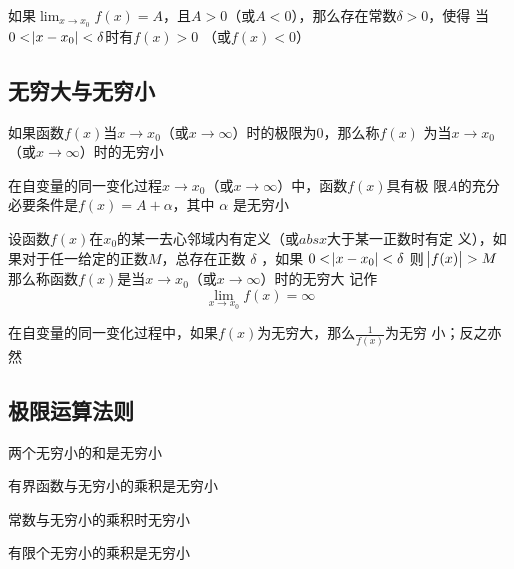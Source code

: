\documentclass[11pt]{article}
\begin{document}
\begin{theorem}[函数极限的局部保号性]
如果\(\lim_{x\to x_0}f(x)=A\)，且\(A>0\)（或\(A<0\)），那么存在常数\(\delta>0\)，使得
当\(0<\abs{x-x_0}<\delta\)时有\(f(x)>0\) （或\(f(x)<0\)）
\end{theorem}
\subsection{无穷大与无穷小}
\label{sec:org1fb2184}
\begin{definition}[]
如果函数\(f(x)\)当\(x\to x_0\)（或\(x\to\infty\)）时的极限为0，那么称\(f(x)\)
为当\(x\to x_0\)（或\(x\to\infty\)）时的无穷小
\end{definition}

\begin{theorem}[]
在自变量的同一变化过程\(x\to x_0\)（或\(x\to\infty\)）中，函数\(f(x)\)具有极
限\(A\)的充分必要条件是\(f(x)=A+\alpha\)，其中 \(\alpha\) 是无穷小
\end{theorem}

\begin{definition}[]
设函数\(f(x)\)在\(x_0\)的某一去心邻域内有定义（或\(abs{x}\)大于某一正数时有定
义），如果对于任一给定的正数\(M\)，总存在正数 \(\delta\) ，如果
\(0<\abs{x-x_0}<\delta\) 则
\(\abs{f(x)}>M\)
那么称函数\(f(x)\)是当\(x\to x_0\)（或\(x\to\infty\)）时的无穷大
记作
\begin{equation*}
\lim_{x\to x_0}f(x)=\infty
\end{equation*}
\end{definition}

\begin{theorem}[]
在自变量的同一变化过程中，如果\(f(x)\)为无穷大，那么\(\frac{1}{f(x)}\)为无穷
小；反之亦然
\end{theorem}
\subsection{极限运算法则}
\label{sec:org6c10b91}
\begin{theorem}[]
两个无穷小的和是无穷小
\end{theorem}

\begin{theorem}[]
有界函数与无穷小的乘积是无穷小
\end{theorem}

\begin{corollary}[]
常数与无穷小的乘积时无穷小
\end{corollary}

\begin{corollary}[]
有限个无穷小的乘积是无穷小
\end{corollary}
\end{document}
